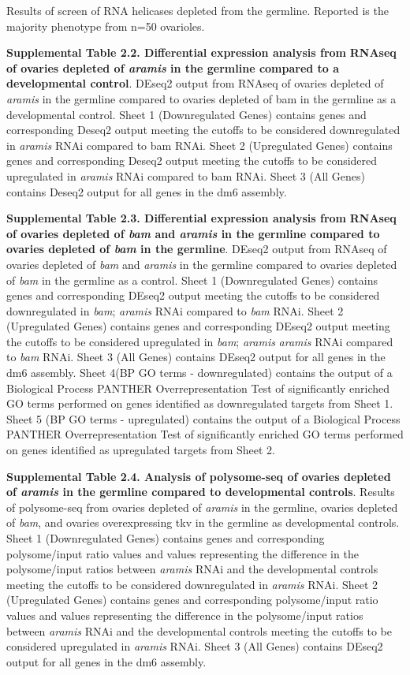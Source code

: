 \documentclass[12pt,twoside]{reedthesis}
\begin{document}
Results of screen of RNA helicases depleted from the germline. Reported
is the majority phenotype from n=50 ovarioles.

\textbf{Supplemental Table 2.2. Differential expression analysis from} \textbf{RNAseq
of ovaries depleted of \emph{aramis} in the germline compared to a
developmental control}. DEseq2 output from RNAseq of ovaries depleted
of \emph{aramis} in the germline compared to ovaries depleted of bam in the
germline as a developmental control. Sheet 1 (Downregulated Genes)
contains genes and corresponding Deseq2 output meeting the cutoffs to be
considered downregulated in \emph{aramis} RNAi compared to bam RNAi. Sheet 2
(Upregulated Genes) contains genes and corresponding Deseq2 output
meeting the cutoffs to be considered upregulated in \emph{aramis} RNAi
compared to bam RNAi. Sheet 3 (All Genes) contains Deseq2 output for all
genes in the dm6 assembly.

\textbf{Supplemental Table 2.3. Differential expression analysis from} \textbf{RNAseq
of ovaries depleted of \emph{bam} and \emph{aramis} in the germline compared to
ovaries depleted of \emph{bam} in the germline}. DEseq2 output from RNAseq
of ovaries depleted of \emph{bam} and \emph{aramis} in the germline compared to
ovaries depleted of \emph{bam} in the germline as a control. Sheet 1
(Downregulated Genes) contains genes and corresponding DEseq2 output
meeting the cutoffs to be considered downregulated in \emph{bam}; \emph{aramis}
RNAi compared to \emph{bam} RNAi. Sheet 2 (Upregulated Genes) contains genes
and corresponding DEseq2 output meeting the cutoffs to be considered
upregulated in \emph{bam}; \emph{aramis} \emph{aramis} RNAi compared to \emph{bam} RNAi.
Sheet 3 (All Genes) contains DEseq2 output for all genes in the dm6
assembly. Sheet 4(BP GO terms - downregulated) contains the output of a
Biological Process PANTHER Overrepresentation Test of significantly
enriched GO terms performed on genes identified as downregulated targets
from Sheet 1. Sheet 5 (BP GO terms - upregulated) contains the output of
a Biological Process PANTHER Overrepresentation Test of significantly
enriched GO terms performed on genes identified as upregulated targets
from Sheet 2.

\textbf{Supplemental Table 2.4. Analysis of polysome-seq of ovaries depleted of
\emph{aramis} in the germline compared to developmental controls}. Results
of polysome-seq from ovaries depleted of \emph{aramis} in the germline,
ovaries depleted of \emph{bam}, and ovaries overexpressing tkv in the
germline as developmental controls. Sheet 1 (Downregulated Genes)
contains genes and corresponding polysome/input ratio values and values
representing the difference in the polysome/input ratios between
\emph{aramis} RNAi and the developmental controls meeting the cutoffs to be
considered downregulated in \emph{aramis} RNAi. Sheet 2 (Upregulated Genes)
contains genes and corresponding polysome/input ratio values and values
representing the difference in the polysome/input ratios between
\emph{aramis} RNAi and the developmental controls meeting the cutoffs to be
considered upregulated in \emph{aramis} RNAi. Sheet 3 (All Genes) contains
DEseq2 output for all genes in the dm6 assembly.
\end{document}
